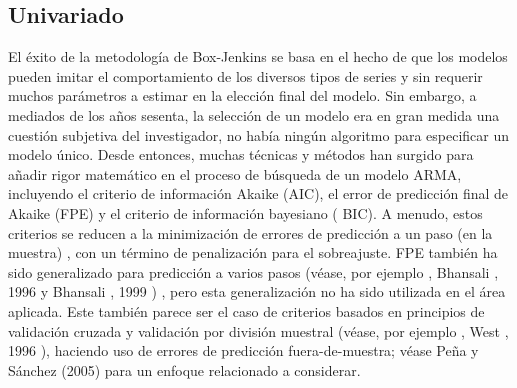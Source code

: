 \documentclass{llncs}
\begin{document}
\begin{table}
\caption{Lista de ejemplos de aplicaciones reales}

\end{table}
\subsection{Univariado}

El éxito de la metodología de Box-Jenkins se basa en el hecho de que los modelos pueden imitar el comportamiento de los diversos tipos de series y sin requerir muchos parámetros a estimar en la elección final del modelo. Sin embargo, a mediados de los años sesenta, la selección de un modelo era en gran medida una cuestión subjetiva del investigador, no había ningún algoritmo para especificar un modelo único. Desde entonces, muchas técnicas y métodos han surgido para añadir rigor matemático en el proceso de búsqueda de un modelo ARMA, incluyendo el criterio de información Akaike (AIC), el error de predicción final de Akaike (FPE) y el criterio de información bayesiano ( BIC). A menudo, estos criterios se reducen a la minimización de errores de predicción a un paso (en la muestra) , con un término de penalización para el sobreajuste. FPE también ha sido generalizado para predicción a varios pasos (véase, por ejemplo , Bhansali , 1996 \cite{Bhansali1996577} y Bhansali , 1999 \cite{Bhansali1999295}) , pero esta generalización no ha sido utilizada en el área aplicada. Este también parece ser el caso de criterios basados en principios de validación cruzada y validación por división muestral (véase, por ejemplo , West , 1996 \cite{West19961084}), haciendo uso de errores de predicción fuera-de-muestra; véase Peña y Sánchez (2005) \cite{Pena2005135} para un enfoque relacionado a considerar.
\end{document}
